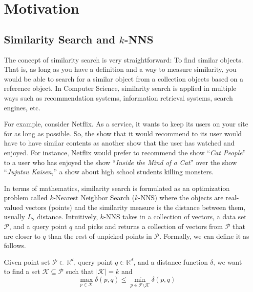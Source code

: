\chapter{Motivation}

\section{Similarity Search and \(k\)-NNS}

The concept of similarity search is very straightforward: To find similar objects. That is, as long as you have a definition and a way to measure similarity, you would be able to search for a similar object from a collection objects based on a reference object. In Computer Science, similarity search is applied in multiple ways such as recommendation systems, information retrieval systems, search engines, etc.

For example, consider Netflix. As a service, it wants to keep its users on your site for as long as possible. So, the show that it would recommend to its user would have to have similar contents as another show that the user has watched and enjoyed. For instance, Netflix would prefer to recommend the show ``\textit{Cat People}'' to a user who has enjoyed the show ``\textit{Inside the Mind of a Cat}'' over the show ``\textit{Jujutsu Kaisen},'' a show about high school students killing monsters.

In terms of mathematics, similarity search is formulated as an optimization problem called \(k\)-Nearest Neighbor Search (\(k\)-NNS) where the objects are real-valued vectors (points) and the similarity measure is the distance between them, usually \(L_2\) distance. Intuitively, \(k\)-NNS takes in a collection of vectors, a data set \(\mathcal{P}\), and a query point \(q\) and picks and returns a collection of vectors from \(\mathcal{P}\) that are closer to \(q\) than the rest of unpicked points in \(\mathcal{P}\). Formally, we can define it as follows.

\begin{definition}
    Given point set \(\mathcal{P} \subset \mathbb{R}^d\), query point \(q \in \mathbb{R}^d\), and a distance function \(\delta\), we want to find a set \(\mathcal{K} \subseteq \mathcal{P}\) such that \(|\mathcal{K}| = k\) and
    \[
        \max_{p \in \mathcal{K}} \delta(p, q) \leq \min_{p \in \mathcal{P} \setminus \mathcal{K}} \delta(p, q)
    \]
\end{definition}

